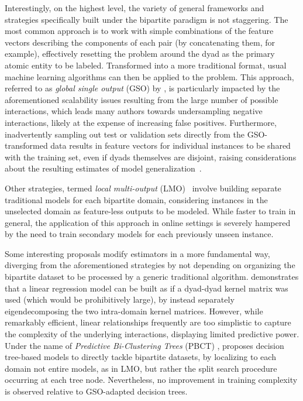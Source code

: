 Interestingly, on the highest level, the variety of general frameworks and strategies specifically built under the bipartite paradigm is not staggering. %
%
The most common approach is to work with simple combinations of the feature vectors describing the components of each pair (by concatenating them, for example), effectively resetting the problem around the dyad as the primary atomic entity to be labeled. Transformed into a more traditional format, usual machine learning algorithms can then be applied to the problem. This approach, referred to as \emph{global single output} (GSO) by \cite{}, is particularly impacted by the aforementioned scalability issues resulting from the large number of possible interactions, which leads many authors towards undersampling negative interactions, likely at the expense of increasing false positives. %
Furthermore, inadvertently sampling out test or validation sets directly from the GSO-transformed data results in feature vectors for individual instances to be shared with the training set, even if dyads themselves are disjoint, 
raising considerations about the resulting estimates of model generalization~\citep{pahikalla2015}.

Other strategies, termed \emph{local multi-output} (LMO)~\citep{} involve building separate traditional models for each bipartite domain, considering instances in the unselected domain as feature-less outputs to be modeled. While faster to train in general, the application of this approach in online settings is severely hampered by the need to train secondary models for each previously unseen instance.

Some interesting proposals modify estimators in a more fundamental way, diverging from the aforementioned strategies by not depending on organizing the bipartite dataset to be processed by a generic traditional algorithm. \cite{} demonstrates that a linear regression model can be built as if a dyad-dyad kernel matrix was used (which would be prohibitively large), by instead separately eigendecomposing the two intra-domain kernel matrices. However, while remarkably efficient, linear relationships frequently are too simplistic to capture the complexity of the underlying interactions, displaying limited predictive power.
Under the name of \emph{Predictive Bi-Clustering Trees} (PBCT) \cite{pliakos2018predictive}, proposes decision tree-based models to directly tackle bipartite datasets, by localizing to each domain not entire models, as in LMO, but rather the split search procedure occurring at each tree node. Nevertheless, no improvement in training complexity is observed relative to GSO-adapted decision trees.

